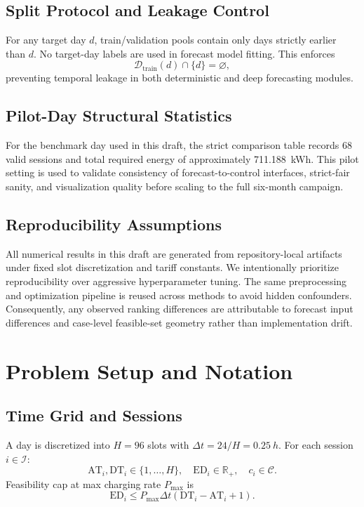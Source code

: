 \documentclass[journal]{IEEEtran}
\newcommand{\AT}{\mathrm{AT}}
\newcommand{\DT}{\mathrm{DT}}
\newcommand{\ED}{\mathrm{ED}}
\newcommand{\R}{\mathbb{R}}
\begin{document}
\subsection{Split Protocol and Leakage Control}
For any target day $d$, train/validation pools contain only days strictly earlier than $d$. No target-day labels are used in forecast model fitting. This enforces
\begin{equation}
\mathcal{D}_{\mathrm{train}}(d)\cap\{d\}=\varnothing,
\end{equation}
preventing temporal leakage in both deterministic and deep forecasting modules.

\subsection{Pilot-Day Structural Statistics}
For the benchmark day used in this draft, the strict comparison table records 68 valid sessions and total required energy of approximately \SI{711.188}{kWh}. This pilot setting is used to validate consistency of forecast-to-control interfaces, strict-fair sanity, and visualization quality before scaling to the full six-month campaign.

\subsection{Reproducibility Assumptions}
All numerical results in this draft are generated from repository-local artifacts under fixed slot discretization and tariff constants. We intentionally prioritize reproducibility over aggressive hyperparameter tuning. The same preprocessing and optimization pipeline is reused across methods to avoid hidden confounders. Consequently, any observed ranking differences are attributable to forecast input differences and case-level feasible-set geometry rather than implementation drift.

\section{Problem Setup and Notation}

\subsection{Time Grid and Sessions}
A day is discretized into $H=96$ slots with $\Delta t = 24/H = \SI{0.25}{h}$. For each session $i \in \mathcal{I}$:
\begin{equation}
\AT_i,\DT_i \in \{1,\dots,H\},\quad \ED_i \in \R_{+},\quad c_i \in \mathcal{C}.
\end{equation}
Feasibility cap at max charging rate $P_{\max}$ is
\begin{equation}
\ED_i \le P_{\max}\Delta t(\DT_i-\AT_i+1).
\end{equation}
\end{document}
